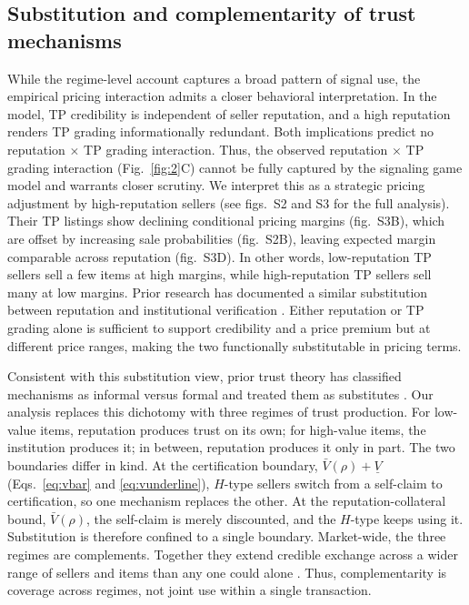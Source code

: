 \documentclass[11pt,letterpaper]{article}
\theoremstyle{definition}
\begin{document}
\subsection*{Substitution and complementarity of trust mechanisms}

While the regime-level account captures a broad pattern of signal use, the empirical pricing interaction admits a closer behavioral interpretation. In the model, TP credibility is independent of seller reputation, and a high reputation renders TP grading informationally redundant. Both implications predict no reputation $\times$ TP grading interaction. Thus, the observed reputation $\times$ TP grading interaction (Fig.~\ref{fig:2}C) cannot be fully captured by the signaling game model and warrants closer scrutiny. We interpret this as a strategic pricing adjustment by high-reputation sellers (see figs.~S2 and S3 for the full analysis). Their TP listings show declining conditional pricing margins (fig.~S3B), which are offset by increasing sale probabilities (fig.~S2B), leaving expected margin comparable across reputation (fig.~S3D). In other words, low-reputation TP sellers sell a few items at high margins, while high-reputation TP sellers sell many at low margins. Prior research has documented a similar substitution between reputation and institutional verification \citep{HuiSaeediShenSundaresan2016}. Either reputation or TP grading alone is sufficient to support credibility and a price premium but at different price ranges, making the two functionally substitutable in pricing terms.

Consistent with this substitution view, prior trust theory has classified mechanisms as informal versus formal and treated them as substitutes \citep{Zucker1986, Kollock1999, Cook2009, CookHardinLevi2005}. Our analysis replaces this dichotomy with three regimes of trust production. For low-value items, reputation produces trust on its own; for high-value items, the institution produces it; in between, reputation produces it only in part. The two boundaries differ in kind. At the certification boundary, $\bar{V}(\rho) + \underline{V}$ (Eqs.~\ref{eq:vbar} and \ref{eq:vunderline}), $H$-type sellers switch from a self-claim to certification, so one mechanism replaces the other. At the reputation-collateral bound, $\bar{V}(\rho)$, the self-claim is merely discounted, and the $H$-type keeps using it. Substitution is therefore confined to a single boundary. Market-wide, the three regimes are complements. Together they extend credible exchange across a wider range of sellers and items than any one could alone \citep{JinLeslie2009, Bai2025}. Thus, complementarity is coverage across regimes, not joint use within a single transaction.
\end{document}
